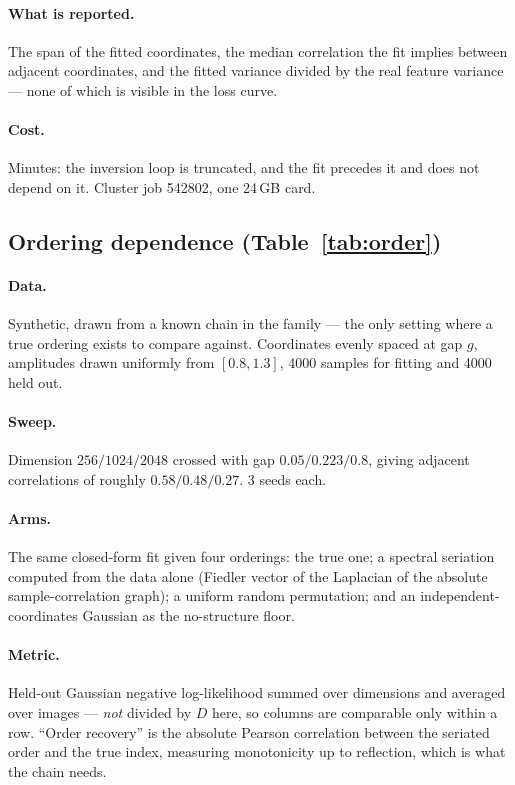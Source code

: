 \documentclass[11pt,a4paper]{article}
\begin{document}
\paragraph{What is reported.} The span of the fitted coordinates, the median correlation the
fit implies between adjacent coordinates, and the fitted variance divided by the real feature
variance --- none of which is visible in the loss curve.

\paragraph{Cost.} Minutes: the inversion loop is truncated, and the fit precedes it and does
not depend on it. Cluster job 542802, one 24\,GB card.

\subsection{Ordering dependence (Table~\ref{tab:order})}

\paragraph{Data.} Synthetic, drawn from a known chain in the family --- the only setting where
a true ordering exists to compare against. Coordinates evenly spaced at gap $g$, amplitudes
drawn uniformly from $[0.8, 1.3]$, 4000 samples for fitting and 4000 held out.

\paragraph{Sweep.} Dimension $256/1024/2048$ crossed with gap $0.05/0.223/0.8$, giving adjacent
correlations of roughly $0.58/0.48/0.27$. 3 seeds each.

\paragraph{Arms.} The same closed-form fit given four orderings: the true one; a spectral
seriation computed from the data alone (Fiedler vector of the Laplacian of the absolute
sample-correlation graph); a uniform random permutation; and an independent-coordinates
Gaussian as the no-structure floor.

\paragraph{Metric.} Held-out Gaussian negative log-likelihood summed over dimensions and
averaged over images --- \emph{not} divided by $D$ here, so columns are comparable only within
a row. ``Order recovery'' is the absolute Pearson correlation between the seriated order and
the true index, measuring monotonicity up to reflection, which is what the chain needs.
\end{document}
